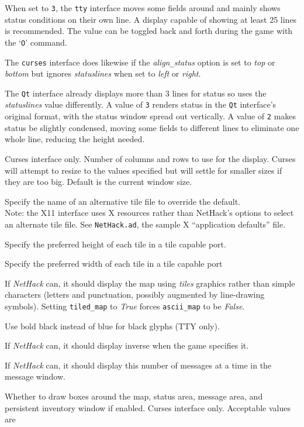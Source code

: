 When set to {\tt 3}, the {\tt tty} interface moves some fields around and
mainly shows status conditions on their own line.
A display capable of showing at least 25 lines is recommended.
The value can be toggled back and forth during the game with the `{\tt O}'
command.

The {\tt curses} interface does likewise if the
{\it align\verb+_+status\/}
option is set to {\it top\/} or {\it bottom\/} but ignores
{\it statuslines\/}
when set to {\it left\/} or {\it right}.

The {\tt Qt} interface already displays more than 3 lines for status
so uses the
{\it statuslines\/}
value differently.
A value of {\tt 3} renders status in the {\tt Qt} interface's
original format, with the status window spread out vertically.
A value of {\tt 2} makes status be slightly condensed, moving some
fields to different lines to eliminate one whole line, reducing the
height needed.
\item[\ib{term\verb+_+cols} {\normalfont and}]
\item[\ib{term\verb+_+rows}]
Curses interface only.
Number of columns and rows to use for the display.
Curses will attempt to resize to the values specified but will settle
for smaller sizes if they are too big.
Default is the current window size.
\item[\ib{tile\verb+_+file}]
Specify the name of an alternative tile file to override the default.
\\
Note: the X11 interface uses X resources rather than NetHack's options
to select an alternate tile file.
See {\tt NetHack.ad}, the sample X ``application defaults'' file.
\item[\ib{tile\verb+_+height}]
Specify the preferred height of each tile in a tile capable port.
\item[\ib{tile\verb+_+width}]
Specify the preferred width of each tile in a tile capable port
\item[\ib{tiled\verb+_+map}]
If {\it NetHack\/} can, it should display the map using {\it tiles} graphics
rather than simple characters (letters and punctuation, possibly
augmented by line-drawing symbols).
Setting {\tt tiled\verb+_+map} to {\it True\/} forces
{\tt ascii\verb+_+map} to be {\it False}.
\item[\ib{use\verb+_+darkgray}]
Use bold black instead of blue for black glyphs (TTY only).
\item[\ib{use\verb+_+inverse}]
If {\it NetHack\/} can, it should display inverse when the game specifies it.
\item[\ib{vary\verb+_+msgcount}]
If {\it NetHack\/} can, it should display this number of messages at a time
in the message window.
\item[\ib{windowborders}]
Whether to draw boxes around the map, status area, message area, and
persistent inventory window if enabled.
Curses interface only.
Acceptable values are

